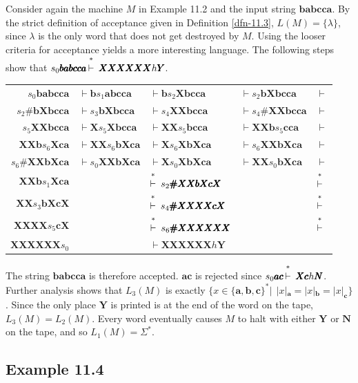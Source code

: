 Consider again the machine $M$ in Example 11.2 and the input string
$\pmb{babcca}$. By the strict definition of acceptance given in Definition \ref{dfn-11.3},
$L(M)=\{\lambda\}$, since $\lambda$ is the only word that does not get destroyed
by $M$. Using the looser criteria for acceptance yields a more interesting
language. The following steps show that $s_0\pmb{babcca}\Dvdash\pmb{XXXXXX}h
\pmb{Y}$.
\begin{center}\begin{tabular}{rllll}
$s_0\pmb{babcca}$ & $\vdash\pmb{b}s_1\pmb{abcca}$ & $\vdash\pmb{b}s_2\pmb{Xbcca}$
	& $\vdash s_2\pmb{bXbcca}$ & $\vdash$ \\
$s_2\pmb{\#bXbcca}$ & $\vdash s_3\pmb{bXbcca}$ & $\vdash s_4\pmb{XXbcca}$ &
	$\vdash s_4\pmb{\#XXbcca}$ & $\vdash$ \\
$s_5\pmb{XXbcca}$ & $\vdash\pmb{X}s_5\pmb{Xbcca}$ & $\vdash\pmb{XX}s_5\pmb{bcca}$
	& $\vdash\pmb{XXb}s_5\pmb{cca}$ & $\vdash$ \\
$\pmb{XXb}s_6\pmb{Xca}$ & $\vdash\pmb{XX}s_6\pmb{bXca}$ & $\vdash\pmb{X}s_6
	\pmb{XbXca}$ & $\vdash s_6\pmb{XXbXca}$ & $\vdash$ \\
$s_6\pmb{\#XXbXca}$ & $\vdash s_0\pmb{XXbXca}$ & $\vdash\pmb{X}s_0\pmb{XbXca}$
	& $\vdash\pmb{XX}s_0\pmb{bXca}$ & $\vdash$ \\
$\pmb{XXb}s_1\pmb{Xca}$ && $\Dvdash s_2\pmb{\#XXbXcX}$ && $\Dvdash$ \\
$\pmb{XX}s_3\pmb{bXcX}$ && $\Dvdash s_4\pmb{\#XXXXcX}$ && $\Dvdash$ \\
$\pmb{XXXX}s_5\pmb{cX}$ && $\Dvdash s_6\pmb{\#XXXXXX}$ && $\Dvdash$ \\
$\pmb{XXXXXX}s_0$ && $\vdash\pmb{XXXXXX}h\pmb{Y}$
\end{tabular}\end{center}
The string $\pmb{babcca}$ is therefore accepted. $\pmb{ac}$ is rejected since
$s_0\pmb{ac}\Dvdash\pmb{Xc}h\pmb{N}$. Further analysis shows that $L_3(M)$ is
exactly $\{x\in\{\pmb{a},\pmb{b},\pmb{c}\}^*|\ \ |x|_{\pmb{a}}=|x|_{\pmb{b}}=
|x|_{\pmb{c}}\}$. Since the only place $\pmb{Y}$ is printed is at the end of the
word on the tape, $L_3(M) = L_2(M)$. Every word eventually causes $M$ to halt
with either $\pmb{Y}$ or $\pmb{N}$ on the tape, and so $L_1(M)=\Sigma^*$.

\subsection*{Example 11.4}

